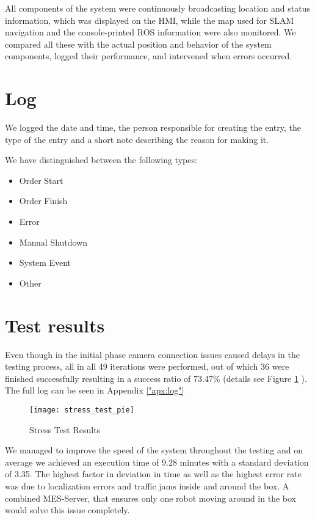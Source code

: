 All components of the system were continuously broadcasting location and status information, which was displayed on the HMI, while the map used for SLAM navigation and the console-printed ROS information were also monitored. We compared all these with the actual position and behavior of the system components, logged their performance, and intervened when errors occurred. 

\section{Log}

We logged the date and time, the person  responsible for creating the entry, the type of the entry and a short note describing the reason for making it.

We have distinguished between the following types:

\begin{itemize}
	\item Order Start
	\item Order Finish
	\item Error
	\item Manual Shutdown
	\item System Event
	\item Other
\end{itemize}


\section{Test results}

Even though in the initial phase camera connection issues caused delays in the testing process, all in all 49 iterations were performed, out of which 36 were finished successfully resulting in a success ratio of 73.47\% (details see Figure \ref{fig:order_statistics} ). The full log can be seen in Appendix \ref{"apx:log"}


\begin{figure}[H]
	\centering
	\texttt{[image: stress\_test\_pie]}
	\caption{Stress Test Results}
	\label{fig:order_statistics}
\end{figure}

We managed to improve the speed of the system throughout the testing and on average we achieved an execution time of  9.28 minutes with a standard deviation of 3.35. The highest factor in deviation in time as well as the highest error rate was due to localization errors and traffic jams inside and around the box. A combined MES-Server, that ensures only one robot moving around in the box would solve this issue completely.

